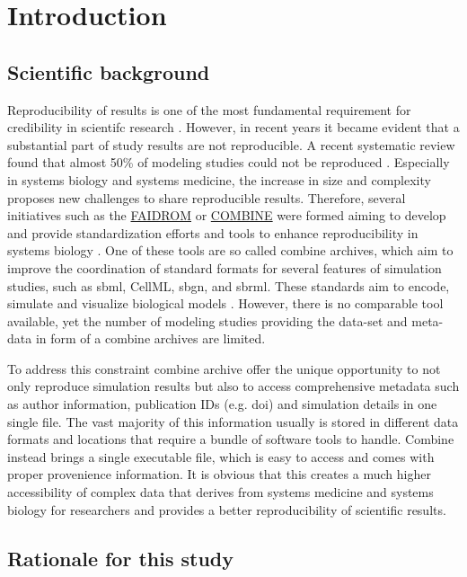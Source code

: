 \section*{Introduction}

\subsection*{Scientific background}
Reproducibility of results is one of the most fundamental requirement for credibility in scientifc research \cite{tiwari2021reproducibility}. However, in recent years it became evident that a substantial part of study results are not reproducible. A recent systematic review found that almost 50\% of modeling studies could not be reproduced \cite{tiwari2021reproducibility}. Especially in systems biology and systems medicine, the increase in size and complexity proposes new challenges to share reproducible results. Therefore, several initiatives such as the \hyperlink{https://fair-dom.org/}{FAIDROM} or \hyperlink{http://co.mbine.org/}{COMBINE} were formed aiming to develop and provide standardization efforts and tools to enhance reproducibility in systems biology \cite{specificationsb}. One of these tools are so called \ac{combine} archives, which aim to improve the coordination of standard formats for several features of simulation studies, such as \ac{sbml}, CellML, \ac{sbgn}, and \ac{sbrml}. These standards aim to encode, simulate and visualize biological models \cite{combine}. However, there is no comparable tool available, yet the number of modeling studies providing the data-set and meta-data in form of a \ac{combine} archives are limited. 

To address this constraint \ac{combine} archive offer the unique opportunity to not only reproduce simulation results but also to access comprehensive metadata such as author information, publication IDs (e.g. \ac{doi}) and simulation details in one single file. The vast majority of this information usually  is stored in different data formats and locations that require a bundle of software tools to handle. Combine instead brings a single executable file, which is easy to access and comes with proper provenience information. It is obvious that this creates a much higher accessibility of complex data that derives from systems medicine and systems biology for researchers and provides a better reproducibility of scientific results.

\subsection*{Rationale for this study}
